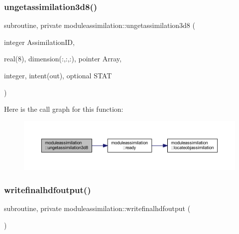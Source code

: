 \subsubsection{\texorpdfstring{ungetassimilation3d8()}{ungetassimilation3d8()}}
{\footnotesize\ttfamily subroutine, private moduleassimilation\+::ungetassimilation3d8 (\begin{DoxyParamCaption}\item[{integer}]{Assimilation\+ID,  }\item[{real(8), dimension(\+:,\+:,\+:), pointer}]{Array,  }\item[{integer, intent(out), optional}]{S\+T\+AT }\end{DoxyParamCaption})\hspace{0.3cm}{\ttfamily [private]}}

Here is the call graph for this function\+:\nopagebreak
\begin{figure}[H]
\begin{center}
\leavevmode
\includegraphics[width=350pt]{namespacemoduleassimilation_a06544a43532e67f29e5ac264d6870860_cgraph}
\end{center}
\end{figure}
\mbox{\label{namespacemoduleassimilation_a68cb52758df87c362f43dd3e9690121b}} 
\subsubsection{\texorpdfstring{writefinalhdfoutput()}{writefinalhdfoutput()}}
{\footnotesize\ttfamily subroutine, private moduleassimilation\+::writefinalhdfoutput (\begin{DoxyParamCaption}{ }\end{DoxyParamCaption})\hspace{0.3cm}{\ttfamily [private]}}

